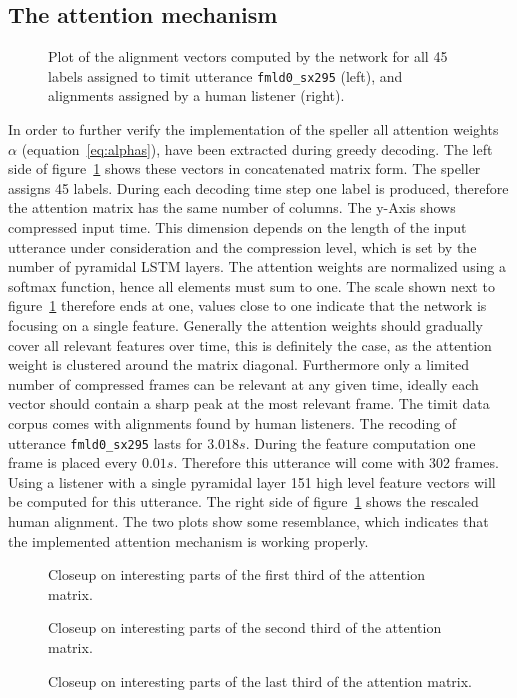 \subsection{The attention mechanism}
\begin{figure}
\centering


\caption{Plot of the alignment vectors computed by the network for all 45 labels assigned to timit utterance \texttt{fmld0\_sx295} (left), and alignments assigned by a human listener (right).}
\label{fig:fullAttention}
\end{figure}
In order to further verify the implementation of the speller all attention weights $\alpha$ (equation~\ref{eq:alphas}), have been extracted during greedy decoding. The left side of figure~\ref{fig:fullAttention} shows these vectors in concatenated matrix form. The speller assigns 45 labels. During each decoding time step one label is produced, therefore the attention matrix has the same number of columns. The y-Axis shows compressed input time. This dimension depends on the length of the input utterance under consideration and the compression level, which is set by the number of pyramidal LSTM layers. The attention weights are normalized using a softmax function, hence all elements must sum to one. The scale shown next to figure~\ref{fig:fullAttention} therefore ends at one, values close to one indicate that the network is focusing on a single feature. Generally the attention weights should gradually cover all relevant features over time, this is definitely the case, as the attention weight is clustered around the matrix diagonal. 
Furthermore only a limited number of compressed frames can be relevant at any given time, ideally each vector should contain a sharp peak at the most relevant frame.   
The timit data corpus comes with alignments found by human listeners. The recoding of utterance \texttt{fmld0\_sx295} lasts for $3.018s$. During the feature computation one frame is placed every $0.01s$. Therefore this utterance will come with 302 frames. Using a listener with a single pyramidal layer 151 high level feature vectors will be computed for this utterance. The right side of figure~\ref{fig:fullAttention} shows the rescaled human alignment. The two plots show some resemblance, which indicates that the implemented attention mechanism is working properly. 
\begin{figure}
\centering

\caption{Closeup on interesting parts of the first third of the attention matrix.}

\caption{Closeup on interesting parts of the second third of the attention matrix.}

\caption{Closeup on interesting parts of the last third of the attention matrix.}
\label{fig:attention3}
\end{figure}
